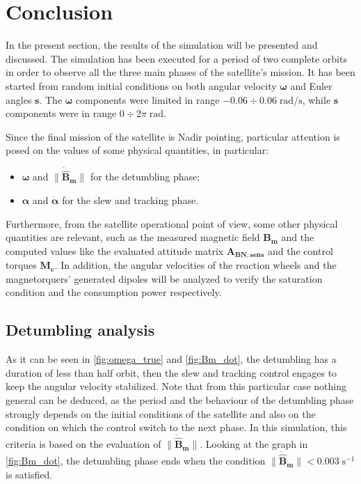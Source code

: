 \section{Conclusion}
\label{sec:conclusion}

In the present section, the results of the simulation will be presented and discussed. The simulation has been executed for a period of two complete orbits in order to observe all the three main phases of the satellite's mission. It has been started from random initial conditions on both angular velocity $\boldsymbol{\omega}$ and Euler angles $\boldsymbol{s}$.
The $\boldsymbol{\omega}$ components were limited in range $-0.06 \div 0.06 \; \text{rad/s}$, while $\boldsymbol{s}$ components were in range $0 \div 2 \pi \; \text{rad}$.

Since the final mission of the satellite is Nadir pointing, particular attention is posed on the values of some physical quantities, in particular:

\begin{itemize}[wide,itemsep=3pt,topsep=3pt]
    \item $\boldsymbol{\omega}$ and $\lVert \boldsymbol{\dot{\hat{{B}}}_m} \rVert$ for the detumbling phase;
    \item $\boldsymbol{\alpha}$ and $\boldsymbol{\dot{\alpha}}$ for the slew and tracking phase.
\end{itemize}

Furthermore, from the satellite operational point of view, some other physical quantities are relevant, such as the measured magnetic field $\boldsymbol{B_m}$ and the computed values like the evaluated attitude matrix $\boldsymbol{A_{BN,sens}}$ and the control torques $\boldsymbol{M_c}$. In addition, the angular velocities of the reaction wheels and the magnetorquers' generated dipoles will be analyzed to verify the saturation condition and the consumption power respectively.


\subsection{Detumbling analysis}
\label{subsec:detumb_analysis}


As it can be seen in \autoref{fig:omega_true} and \autoref{fig:Bm_dot}, the detumbling has a duration of less than half orbit, then the slew and tracking control engages to keep the angular velocity stabilized. Note that from this particular case nothing general can be deduced, as the period and the behaviour of the detumbling phase strongly depends on the initial conditions of the satellite and also on the condition on which the control switch to the next phase. In this simulation, this criteria is based on the evaluation of $\lVert \boldsymbol{\dot{\hat{{B}}}_m} \rVert$.
Looking at the graph in \autoref{fig:Bm_dot}, the detumbling phase ends when the condition $\lVert \boldsymbol{\dot{\hat{{B}}}_m} \rVert < 0.003 \; \text{s}^{-1}$ is satisfied.

